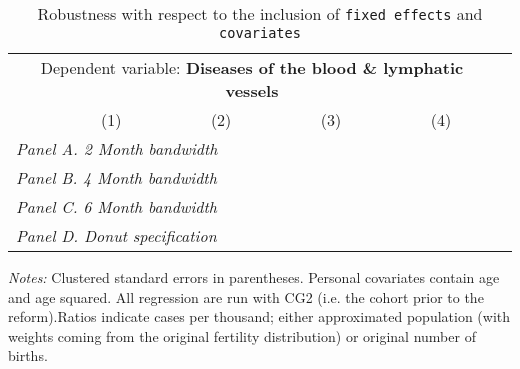  \begin{table}[H] \begin{threeparttable} \centering \caption{Robustness with respect to the inclusion of \texttt{fixed effects} and \texttt{covariates}} {\def\sym#1{\ifmmode^{#1}\else\(^{#1}\)\fi} \begin{tabular}{l*{5}{c}} \toprule \multicolumn{5}{c}{Dependent variable: \textbf{Diseases of the blood \& lymphatic vessels}} \\ \cmidrule(lr){2-5}
            &\multicolumn{1}{c}{(1)}&\multicolumn{1}{c}{(2)}&\multicolumn{1}{c}{(3)}&\multicolumn{1}{c}{(4)}\\
\midrule
 \multicolumn{5}{l}{\emph{Panel A. 2 Month bandwidth}} \\    \midrule\multicolumn{5}{l}{\emph{Panel B. 4 Month bandwidth}} \\    \midrule\multicolumn{5}{l}{\emph{Panel C. 6 Month bandwidth}} \\    \midrule\multicolumn{5}{l}{\emph{Panel D. Donut specification}} \\    \midrule  
\bottomrule \end{tabular} } \begin{tablenotes} \item \scriptsize \emph{Notes:} Clustered standard errors in parentheses. Personal covariates contain age and age squared. All regression are run with CG2 (i.e. the cohort prior to the reform).Ratios indicate cases per thousand; either approximated population (with weights coming from the original fertility distribution) or original number of births. \end{tablenotes} \end{threeparttable} \end{table} 

